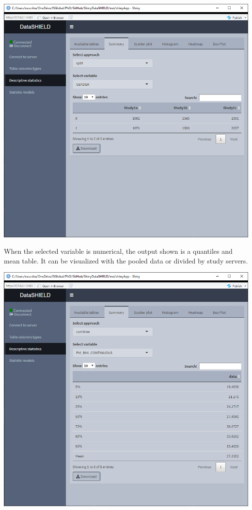 \documentclass[
]{book}
\begin{document}
\includegraphics{images/descriptive_stats1_2.png}

When the selected variable is numerical, the output shown is a quantiles and mean table. It can be visualized with the pooled data or divided by study servers.

\includegraphics{images/descriptive_stats2.png}
\end{document}
